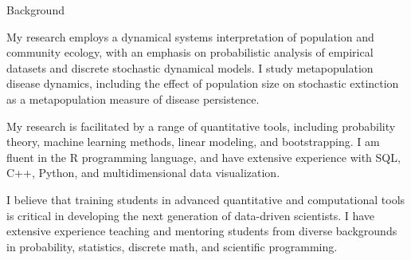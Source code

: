 \documentclass{resume} %
\begin{document}


\begin{rSection}{Background}
\item My research employs a dynamical systems interpretation of
population and community ecology, with an emphasis on probabilistic
analysis of empirical datasets and discrete stochastic dynamical models.  I
study metapopulation disease dynamics, %
including the effect of population size on stochastic
extinction as a metapopulation measure of disease persistence.
\item My research is facilitated by a range of quantitative tools, including probability theory, machine learning
methods, linear modeling, and bootstrapping.  I am fluent in the R programming
language, and have extensive experience with SQL,
C++, Python, and multidimensional data visualization.
\item 
I believe that training students in advanced quantitative 
and computational tools is critical in developing the next 
generation of data-driven scientists.
I have extensive experience teaching and mentoring 
students from diverse backgrounds in 
probability, statistics, discrete math, and scientific programming.
\end{rSection}
\end{document}
